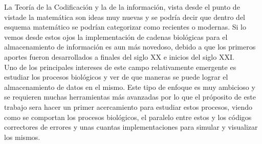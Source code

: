 
La Teoría de la Codificación y la de la información, vista desde el punto de vistade la matemática son ideas muy nuevas y se podría decir que dentro del esquema matemático se podrían categorizar como recientes o modernas. Si lo vemos desde estos ojos la implementación de cadenas biológicas para el almacenamiento de información es aun más novedoso, debido a que los primeros aportes fueron desarrollados a finales del siglo XX e inicios del siglo XXI.\\

Uno de los principales intereses de este campo relativamente emergente es estudiar los procesos biológicos y ver de que maneras se puede lograr el almacenamiento de datos en el mismo. Este tipo de enfoque es muy ambicioso y se requieren muchas herramientas más avanzadas por lo que el próposito de este trabajo sera hacer un primer acercamiento para estudiar estos procesos, viendo como se comportan los procesos biológicos, el paralelo entre estos y los códigos correctores de errores y unas cuantas implementaciones para simular y visualizar los mismos.